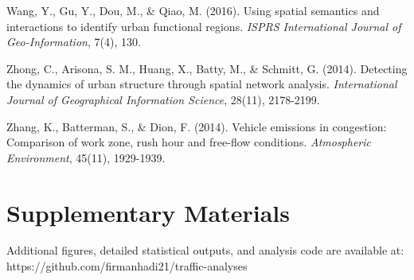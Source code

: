 \documentclass[12pt,a4paper]{article}
\begin{document}
Wang, Y., Gu, Y., Dou, M., \& Qiao, M. (2016). Using spatial semantics and interactions to identify urban functional regions. \emph{ISPRS International Journal of Geo-Information}, 7(4), 130.

Zhong, C., Arisona, S. M., Huang, X., Batty, M., \& Schmitt, G. (2014). Detecting the dynamics of urban structure through spatial network analysis. \emph{International Journal of Geographical Information Science}, 28(11), 2178-2199.

Zhang, K., Batterman, S., \& Dion, F. (2014). Vehicle emissions in congestion: Comparison of work zone, rush hour and free-flow conditions. \emph{Atmospheric Environment}, 45(11), 1929-1939.



\section*{Supplementary Materials}

Additional figures, detailed statistical outputs, and analysis code are available at: https://github.com/firmanhadi21/traffic-analyses
\end{document}
